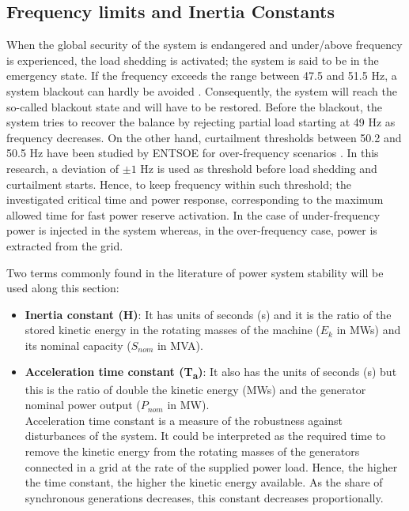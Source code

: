 \subsection{Frequency limits and Inertia Constants}
When the global security of the system is endangered and under/above frequency is experienced, the load shedding is activated; the system is said to be in the emergency state. If the frequency exceeds the range between 47.5 and 51.5 Hz, a system blackout can hardly be avoided \cite{ENTSOE.2016}. Consequently, the system will reach the so-called blackout state and will have to be restored. Before the blackout, the system tries to recover the balance by rejecting partial load starting at 49 Hz as frequency decreases. On the other hand, curtailment thresholds between 50.2 and 50.5 Hz have been studied by ENTSOE for over-frequency scenarios \cite{ENTSOE.2016}. In this research, a deviation of $ \pm1 $ Hz is used as threshold before load shedding and curtailment starts. Hence, to keep frequency within such threshold; the investigated critical time and power response, corresponding to the maximum allowed time for fast power reserve activation. In the case of under-frequency power is injected in the system whereas, in the over-frequency case, power is extracted from the grid.

Two terms commonly found in the literature of power system stability will be used along this section:

\begin{itemize}[leftmargin=*,labelsep=5.8mm]
\item \textbf{Inertia constant (H)}: It has units of seconds (s) and it is the ratio of the stored kinetic energy in the rotating masses of the machine ($E_k$ in MWs) and its nominal capacity ($S_{nom}$ in MVA).\\
\item \textbf{Acceleration time constant (T\textsubscript{a})}: It also has the units of seconds (s) but this is the ratio of double the kinetic energy (MWs) and the generator nominal power output ($P_{nom}$ in MW).\\
Acceleration time constant is a measure of the robustness against disturbances of the system. It could be interpreted as the required time to remove the kinetic energy from the rotating masses of the generators connected in a grid at the rate of the supplied power load. Hence, the higher the time constant, the higher the kinetic energy available. As the share of synchronous generations decreases, this constant decreases proportionally.
\end{itemize}

